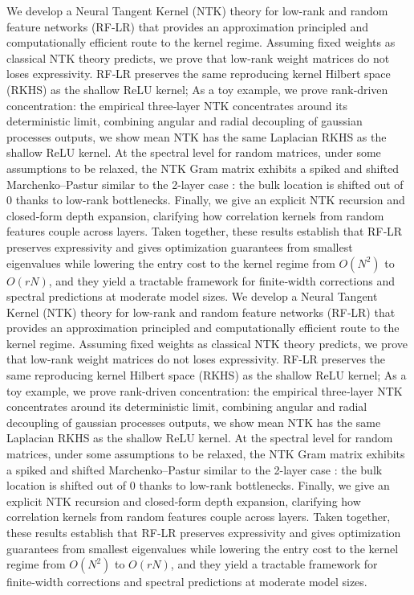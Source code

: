 We develop a Neural Tangent Kernel (NTK) theory for low-rank and random feature networks (RF‑LR) that provides an approximation principled and computationally 
efficient route to the kernel regime. Assuming fixed weights as classical NTK theory predicts, we prove that low-rank weight matrices
do not loses expressivity. RF‑LR preserves the same reproducing kernel Hilbert space (RKHS) as the shallow ReLU kernel; 
As a toy example, we prove rank‑driven concentration: the empirical three‑layer NTK concentrates around its 
deterministic limit, combining angular and radial decoupling of gaussian processes outputs, we show mean NTK
has the same Laplacian RKHS as the shallow ReLU kernel. At the spectral level for random matrices, under some assumptions to be relaxed, the NTK Gram matrix exhibits a 
spiked and shifted Marchenko–Pastur similar to the 2-layer case : the bulk location is shifted out of 0 thanks to low-rank bottlenecks.
Finally, we give an explicit NTK recursion and closed‑form depth expansion, clarifying how correlation kernels from random features couple across layers.
Taken together, these results establish that RF‑LR preserves expressivity and gives optimization guarantees from smallest eigenvalues
while lowering the entry cost to the kernel regime from \(O(N^2)\) to \(O(rN)\), 
and they yield a tractable framework for finite‑width corrections and spectral predictions at moderate model sizes.
We develop a Neural Tangent Kernel (NTK) theory for low-rank and random feature networks (RF‑LR) that provides an approximation principled and computationally 
efficient route to the kernel regime. Assuming fixed weights as classical NTK theory predicts, we prove that low-rank weight matrices
do not loses expressivity. RF‑LR preserves the same reproducing kernel Hilbert space (RKHS) as the shallow ReLU kernel; 
As a toy example, we prove rank‑driven concentration: the empirical three‑layer NTK concentrates around its 
deterministic limit, combining angular and radial decoupling of gaussian processes outputs, we show mean NTK
has the same Laplacian RKHS as the shallow ReLU kernel. At the spectral level for random matrices, under some assumptions to be relaxed, the NTK Gram matrix exhibits a 
spiked and shifted Marchenko–Pastur similar to the 2-layer case : the bulk location is shifted out of 0 thanks to low-rank bottlenecks.
Finally, we give an explicit NTK recursion and closed‑form depth expansion, clarifying how correlation kernels from random features couple across layers.
Taken together, these results establish that RF‑LR preserves expressivity and gives optimization guarantees from smallest eigenvalues
while lowering the entry cost to the kernel regime from \(O(N^2)\) to \(O(rN)\), 
and they yield a tractable framework for finite‑width corrections and spectral predictions at moderate model sizes.
